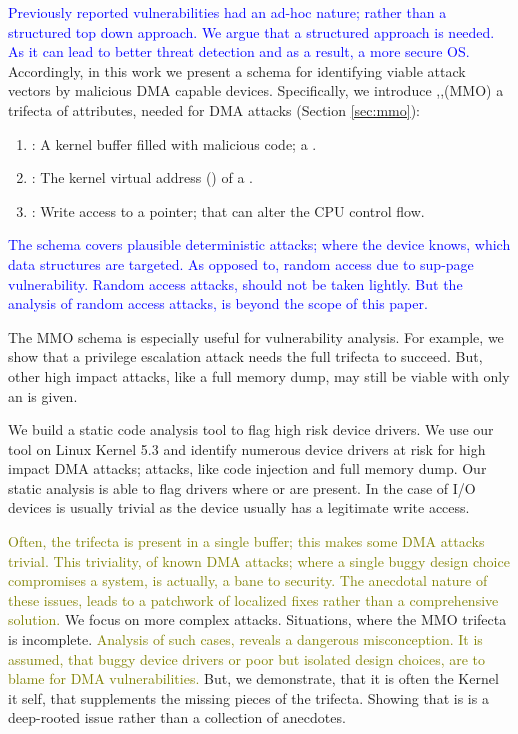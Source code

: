 
\textcolor{blue}{Previously reported vulnerabilities had an ad-hoc nature; rather than a structured top down approach. We argue that a structured approach is needed. As it can lead to better threat detection and as a result, a more secure OS.} Accordingly, in this work we present a schema for identifying viable attack vectors by malicious DMA capable devices. Specifically, we introduce \means,\motivation,\oportunity (MMO) a trifecta of attributes, needed for DMA attacks (Section \ref{sec:mmo}):
\begin{enumerate}
    \item \motivation: A kernel buffer filled with malicious code; a \mabaf.
    \item \means: The kernel virtual address (\kva) of a \mabaf.
    \item \oportunity: Write access to a pointer; that can alter the CPU control flow.
\end{enumerate} 
\textcolor{blue}{The schema covers plausible deterministic attacks; where the device knows, which data structures are targeted. As opposed to, random access due to sup-page vulnerability. Random access  attacks, should not be taken lightly. But the analysis of random access attacks, is beyond the scope of this paper.}


The MMO schema is especially useful for vulnerability analysis. For example, we show that a privilege escalation attack needs the full trifecta to succeed. But, other high impact attacks, like a full memory dump, may still be viable with only an \oportunity{} is given. 

We build a static code analysis tool to flag high risk device drivers. We use our tool on Linux Kernel 5.3 and identify numerous device drivers at risk for high impact DMA attacks; attacks, like code injection and full memory dump. Our static analysis is able to flag drivers where \means{} or \oportunity{} are present. In the case of I/O devices \motivation{} is usually trivial as the device usually has a legitimate write access. 


\textcolor{olive}{Often, the trifecta is present in a single buffer; this makes some DMA attacks trivial\cite{thunder}. This triviality, of known DMA attacks; where a single buggy design choice compromises a system, is actually, a bane to security. The anecdotal nature of these issues, leads to a patchwork of localized fixes rather than a comprehensive solution.} We focus on more complex attacks. Situations, where the MMO trifecta is incomplete. \textcolor{olive}{Analysis of such cases, reveals a dangerous misconception. It is assumed, that buggy device drivers or poor but isolated design choices, are to blame for DMA vulnerabilities.} But, we demonstrate, that it is often the Kernel it self, that supplements the missing pieces of the trifecta. Showing that is is a deep-rooted issue rather than a collection of anecdotes.

